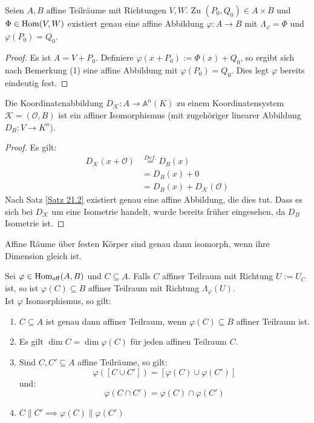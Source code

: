 \documentclass[parskip,a4paper,twoside,DIV15,BCOR12mm]{scrbook}
\begin{document}
\begin{theo}
\label{Satz 21.1}
Seien $A,B$ affine Teilräume mit Richtungen $V,W$.
Zu $(P_0,Q_0)\in A\times B$ und $\Phi\in\operatorname{Hom}(V,W)$ existiert genau eine affine Abbildung
$\varphi:A\to B$ mit $\Lambda_\varphi=\Phi$ und $\varphi(P_0)=Q_0$.
\end{theo}

\begin{proof}
Es ist $A=V+P_0$. Definiere $\varphi(x+P_0):=\Phi(x)+Q_0$, so ergibt sich nach Bemerkung (1)
eine affine Abbildung mit $\varphi(P_0)=Q_0$. Dies legt $\varphi$ bereits eindeutig fest.
\end{proof}

\begin{theo}
\label{Satz 21.2}
Die Koordinatenabbildung $D_\mathcal{K}:A\to\mathbb{A}^n(K)$ zu einem Koordinatensystem 
$\mathcal{K}=(\mathcal{O},B)$ ist ein affiner Isomorphismus (mit zugehöriger linearer Abbildung
$D_B:V\to K^n$).
\end{theo}

\begin{proof}
Es gilt:
\begin{align*}
D_\mathcal{K}(x+\mathcal{O})&\stackrel{Def.}{=} D_B(x)\\
&= D_B(x)+0\\
&= D_B(x)+D_\mathcal{K}(\mathcal{O})
\end{align*}
Nach Satz \ref{Satz 21.2} existiert genau eine affine Abbildung, die dies tut.
Dass es sich bei $D_\mathcal{K}$ um eine Isometrie handelt, wurde bereits früher eingesehen,
da $D_B$ Isometrie ist.
\end{proof}

\begin{corollary}
Affine Räume über festen Körper sind genau dann isomorph, wenn ihre Dimension gleich ist.
\end{corollary}

\begin{theo}
\label{Satz 21.3}
Sei $\varphi\in\operatorname{Hom_{aff}}(A,B)$ und $C\subseteq A$.
Falls $C$ affiner Teilraum  mit Richtung $U:=U_C$ ist, so ist $\varphi(C)\subseteq B$
affiner Teilraum mit Richtung $\Lambda_\varphi(U)$.\\
Ist $\varphi$ Isomorphismus, so gilt:
\begin{enumerate}
\item $C\subseteq A$ ist genau dann affiner Teilraum, wenn $\varphi(C)\subseteq B$ affiner Teilraum ist.
\item Es gilt $\dim C = \dim \varphi(C)$ für jeden affinen Teilraum $C$.
\item Sind $C,C'\subseteq A$ affine Teilräume, so gilt:
\[\varphi([C\cup C'])=[\varphi(C)\cup\varphi(C')]\]
und:
\[\varphi(C\cap C')=\varphi(C)\cap\varphi(C')\]
\item $C\parallel C' \implies \varphi(C)\parallel\varphi(C')$
\end{enumerate}
\end{theo}
\end{document}
